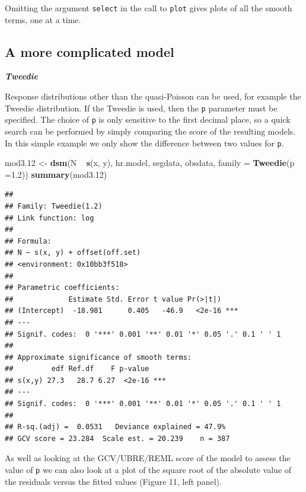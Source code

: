 \documentclass[]{amsart}
\newenvironment{Shaded}{}{}
\newcommand{\KeywordTok}[1]{\textcolor[rgb]{0.00,0.44,0.13}{\textbf{{#1}}}}
\newcommand{\DataTypeTok}[1]{\textcolor[rgb]{0.56,0.13,0.00}{{#1}}}
\newcommand{\FloatTok}[1]{\textcolor[rgb]{0.25,0.63,0.44}{{#1}}}
\newcommand{\StringTok}[1]{\textcolor[rgb]{0.25,0.44,0.63}{{#1}}}
\newcommand{\NormalTok}[1]{{#1}}
\begin{document}
Omitting the argument \texttt{select} in the call to \texttt{plot} gives
plots of all the smooth terms, one at a time.

\subsection{A more complicated model}

\textbf{\emph{Tweedie}}

Response distributions other than the quasi-Poisson can be used, for
example the Tweedie distribution. If the Tweedie is used, then the
\texttt{p} parameter must be specified. The choice of \texttt{p} is only
sensitive to the first decimal place, so a quick search can be performed
by simply comparing the score of the resulting models. In this simple
example we only show the difference between two values for \texttt{p}.

\begin{Shaded}
\begin{Highlighting}[]
\NormalTok{mod3}\FloatTok{.12} \NormalTok{<-}\StringTok{ }\KeywordTok{dsm}\NormalTok{(N ~}\StringTok{ }\KeywordTok{s}\NormalTok{(x, y), hr.model, segdata, obsdata, }
    \DataTypeTok{family =} \KeywordTok{Tweedie}\NormalTok{(}\DataTypeTok{p =}\FloatTok{1.2}\NormalTok{))}
\KeywordTok{summary}\NormalTok{(mod3}\FloatTok{.12}\NormalTok{)}
\end{Highlighting}
\end{Shaded}

\begin{verbatim}
## 
## Family: Tweedie(1.2) 
## Link function: log 
## 
## Formula:
## N ~ s(x, y) + offset(off.set)
## <environment: 0x10bb3f518>
## 
## Parametric coefficients:
##             Estimate Std. Error t value Pr(>|t|)    
## (Intercept)  -18.981      0.405   -46.9   <2e-16 ***
## ---
## Signif. codes:  0 '***' 0.001 '**' 0.01 '*' 0.05 '.' 0.1 ' ' 1
## 
## Approximate significance of smooth terms:
##         edf Ref.df    F p-value    
## s(x,y) 27.3   28.7 6.27  <2e-16 ***
## ---
## Signif. codes:  0 '***' 0.001 '**' 0.01 '*' 0.05 '.' 0.1 ' ' 1
## 
## R-sq.(adj) =  0.0531   Deviance explained = 47.9%
## GCV score = 23.284  Scale est. = 20.239    n = 387
\end{verbatim}

As well as looking at the GCV/UBRE/REML score of the model to assess the
value of \texttt{p} we can also look at a plot of the square root of the
absolute value of the residuals versus the fitted values (Figure 11,
left panel).
\end{document}

